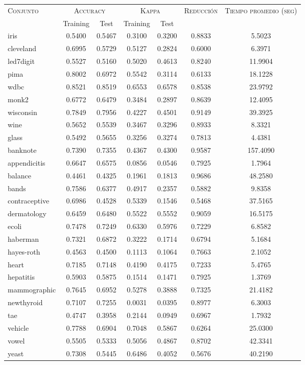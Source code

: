 \begin{table}[]
\centering
\begin{tabular}{l c c c c c c}
\hline
\multirow{2}{*}{\textsc{Conjunto}}
	& \multicolumn{2}{c}{\textsc{Accuracy}}
	& \multicolumn{2}{c}{\textsc{Kappa}}
	& \textsc{Reducción}
	& \textsc{Tiempo promedio (seg)} \\
	& Training & Test
	& Training & Test \\ 
\hline
\hline

iris & 0.5400 & 0.5467 & 0.3100 & 0.3200 & 0.8833 & 5.5023 \\
cleveland & 0.6995 & 0.5729 & 0.5127 & 0.2824 & 0.6000 & 6.3971 \\
led7digit & 0.5527 & 0.5160 & 0.5020 & 0.4613 & 0.8240 & 11.9904 \\
pima & 0.8002 & 0.6972 & 0.5542 & 0.3114 & 0.6133 & 18.1228 \\
wdbc & 0.8521 & 0.8519 & 0.6553 & 0.6578 & 0.8538 & 23.9792 \\
monk2 & 0.6772 & 0.6479 & 0.3484 & 0.2897 & 0.8639 & 12.4095 \\
wisconsin & 0.7849 & 0.7956 & 0.4227 & 0.4501 & 0.9149 & 39.3925 \\
wine & 0.5652 & 0.5539 & 0.3467 & 0.3296 & 0.8933 & 8.3321 \\
glass & 0.5492 & 0.5655 & 0.3256 & 0.3274 & 0.7813 & 4.4381 \\
banknote & 0.7390 & 0.7355 & 0.4367 & 0.4300 & 0.9587 & 157.4090 \\
appendicitis & 0.6647 & 0.6575 & 0.0856 & 0.0546 & 0.7925 & 1.7964 \\
balance & 0.4461 & 0.4325 & 0.1961 & 0.1813 & 0.9686 & 48.2580 \\
bands & 0.7586 & 0.6377 & 0.4917 & 0.2357 & 0.5882 & 9.8358 \\
contraceptive & 0.6986 & 0.4528 & 0.5339 & 0.1546 & 0.5468 & 37.5165 \\
dermatology & 0.6459 & 0.6480 & 0.5522 & 0.5552 & 0.9059 & 16.5175 \\
ecoli & 0.7478 & 0.7249 & 0.6330 & 0.5976 & 0.7229 & 6.8582 \\
haberman & 0.7321 & 0.6872 & 0.3222 & 0.1714 & 0.6794 & 5.1684 \\
hayes-roth & 0.4563 & 0.4500 & 0.1113 & 0.1064 & 0.7663 & 2.1052 \\
heart & 0.7185 & 0.7148 & 0.4190 & 0.4175 & 0.7233 & 5.4765 \\
hepatitis & 0.5903 & 0.5875 & 0.1514 & 0.1471 & 0.7925 & 1.3769 \\
mammographic & 0.7645 & 0.6952 & 0.5278 & 0.3888 & 0.7325 & 21.4182 \\
newthyroid & 0.7107 & 0.7255 & 0.0031 & 0.0395 & 0.8977 & 6.3003 \\
tae & 0.4747 & 0.3958 & 0.2144 & 0.0949 & 0.6967 & 1.7932 \\
vehicle & 0.7788 & 0.6904 & 0.7048 & 0.5867 & 0.6264 & 25.0300 \\
vowel & 0.5505 & 0.5333 & 0.5056 & 0.4867 & 0.8702 & 42.3341 \\
yeast & 0.7308 & 0.5445 & 0.6486 & 0.4052 & 0.5676 & 40.2190 \\


\end{tabular}
\end{table}
